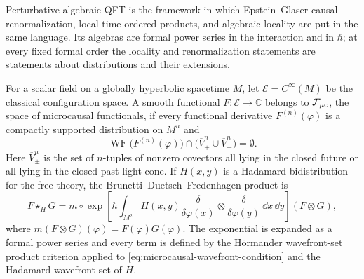 Perturbative algebraic QFT is the framework in which Epstein--Glaser causal
renormalization, local time-ordered products, and algebraic locality are put
in the same language.  Its algebras are formal power series in the
interaction and in \(\hbar\); at every fixed formal order the locality and
renormalization statements are statements about distributions and their
extensions.

\begin{definition}
\label{def:perturbative-algebraic-qft-star-product}
For a scalar field on a globally hyperbolic spacetime \(M\), let
\(\mathcal E=C^\infty(M)\) be the classical configuration space.  A smooth
functional \(F:\mathcal E\to\mathbb C\) belongs to
\(\mathcal F_{\mu{\rm c}}\), the space of microcausal functionals, if every
functional derivative \(F^{(n)}(\varphi)\) is a compactly supported
distribution on \(M^n\) and
\begin{equation}
  \operatorname{WF}\bigl(F^{(n)}(\varphi)\bigr)
  \cap
  \bigl(\overline V_+^n\cup\overline V_-^n\bigr)
  =
  \emptyset .
  \label{eq:microcausal-wavefront-condition}
\end{equation}
Here \(\overline V_\pm^n\) is the set of \(n\)-tuples of nonzero covectors all
lying in the closed future or all lying in the closed past light cone.  If
\(H(x,y)\) is a Hadamard bidistribution for the free theory, the
Brunetti--Duetsch--Fredenhagen product is
\begin{equation}
  F\star_H G
  =
  m\circ
  \exp\!\left[
    \hbar
    \int_{M^2}
      H(x,y)
      \frac{\delta}{\delta\varphi(x)}
      \otimes
      \frac{\delta}{\delta\varphi(y)}
      \,\dd x\,\dd y
  \right](F\otimes G),
  \label{eq:paqft-star-product}
\end{equation}
where \(m(F\otimes G)(\varphi)=F(\varphi)G(\varphi)\).  The exponential is
expanded as a formal power series and every term is defined by the
Hörmander wavefront-set product criterion applied to
\eqref{eq:microcausal-wavefront-condition} and the Hadamard wavefront set of
\(H\).
\end{definition}

